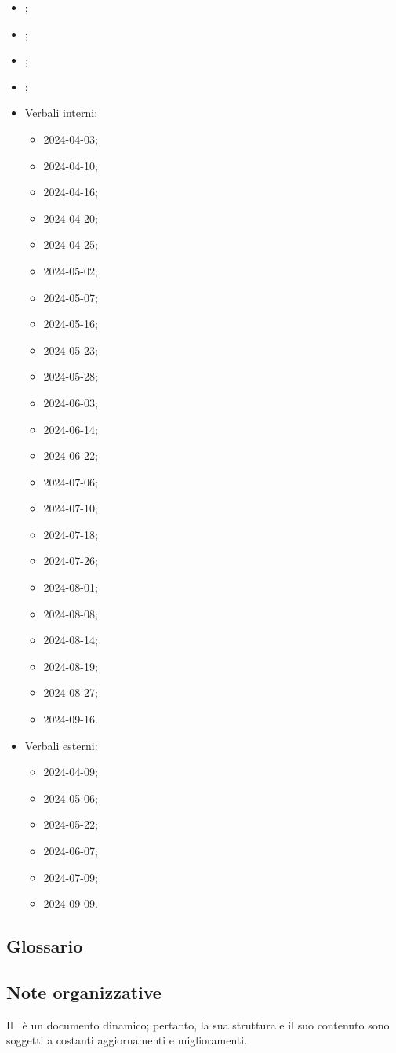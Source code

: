 \begin{itemize}
  \item \Glossario;
  \item \PianoDiProgetto;
  \item \SpecificaTecnica;
  \item \ManualeUtente;
  \item Verbali interni:
  \begin{itemize}
    \item 2024-04-03;
    \item 2024-04-10;
    \item 2024-04-16;
    \item 2024-04-20;
    \item 2024-04-25;
    \item 2024-05-02;
    \item 2024-05-07;
    \item 2024-05-16;
    \item 2024-05-23;
    \item 2024-05-28;
    \item 2024-06-03;
    \item 2024-06-14;
    \item 2024-06-22;
    \item 2024-07-06;
    \item 2024-07-10;
    \item 2024-07-18;
    \item 2024-07-26;
    \item 2024-08-01;
    \item 2024-08-08;
    \item 2024-08-14;
    \item 2024-08-19;
    \item 2024-08-27;
    \item 2024-09-16.
  \end{itemize}
  \item Verbali esterni:
  \begin{itemize}
    \item 2024-04-09;
    \item 2024-05-06;
    \item 2024-05-22;
    \item 2024-06-07;
    \item 2024-07-09;
    \item 2024-09-09.
  \end{itemize}
\end{itemize}

\subsection{Glossario} 
\GlossarioIntroduzione

\subsection{Note organizzative}

\par Il \PdQ\ è un documento dinamico; pertanto, la sua struttura e il suo contenuto sono soggetti a costanti aggiornamenti e miglioramenti.
